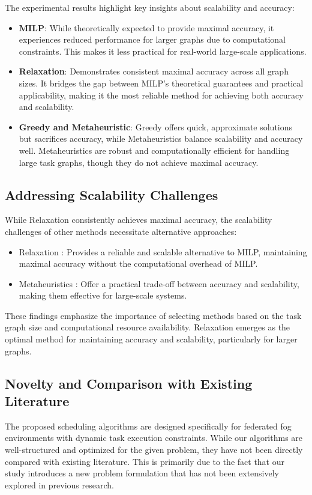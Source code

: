 \documentclass[conference]{IEEEtran}
\begin{document}
The experimental results highlight key insights about scalability and accuracy:
\begin{itemize}
\item \textbf{MILP}: While theoretically expected to provide maximal accuracy, it experiences reduced performance for larger graphs due to computational constraints. This makes it less practical for real-world large-scale applications.
\item \textbf{Relaxation}: Demonstrates consistent maximal accuracy across all graph sizes. It bridges the gap between MILP’s theoretical guarantees and practical applicability, making it the most reliable method for achieving both accuracy and scalability.
\item \textbf{Greedy and Metaheuristic}: Greedy offers quick, approximate solutions but sacrifices accuracy, while Metaheuristics balance scalability and accuracy well. Metaheuristics are robust and computationally efficient for handling large task graphs, though they do not achieve maximal accuracy.
\end{itemize}

\subsection{Addressing Scalability Challenges}

While Relaxation consistently achieves maximal accuracy, the scalability challenges of other methods necessitate alternative approaches:
\begin{itemize}
\item Relaxation : Provides a reliable and scalable alternative to MILP, maintaining maximal accuracy without the computational overhead of MILP.
\item Metaheuristics : Offer a practical trade-off between accuracy and scalability, making them effective for large-scale systems.
\end{itemize}

These findings emphasize the importance of selecting methods based on the task graph size and computational resource availability. Relaxation emerges as the optimal method for maintaining accuracy and scalability, particularly for larger graphs.

\subsection{Novelty and Comparison with Existing Literature}

The proposed scheduling algorithms are designed specifically for federated fog environments with dynamic task execution constraints. While our algorithms are well-structured and optimized for the given problem, they have not been directly compared with existing literature. This is primarily due to the fact that our study introduces a new problem formulation that has not been extensively explored in previous research.
\end{document}
